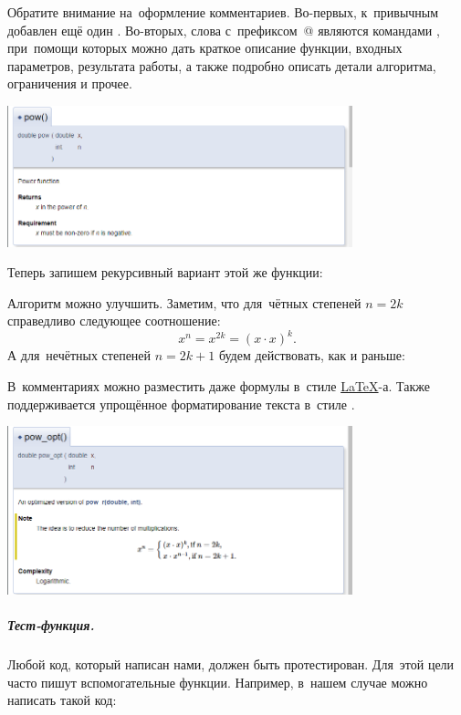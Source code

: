 Обратите внимание на~оформление комментариев. Во-первых, к~привычным \code{//} добавлен ещё один \code{/}. Во-вторых, слова с~префиксом~@ являются командами , при~помощи которых можно дать краткое описание функции, входных параметров, результата работы, а также подробно описать детали алгоритма, ограничения и прочее.

\begin{center}
  \includegraphics[width=0.75\textwidth]{images/doxygen_pow_description.png}
\end{center}

Теперь запишем рекурсивный вариант этой же функции:

Алгоритм можно улучшить. Заметим, что для~чётных степеней \(n = 2k\) справедливо следующее соотношение:
\[
  x^n = x^{2k} = (x\cdot x)^k.
\]
А для~нечётных степеней \(n = 2k + 1\) будем действовать, как и раньше:

В~комментариях можно разместить даже формулы в~стиле \href{\latexurl}{\LaTeX}-а. Также поддерживается упрощённое форматирование текста в~стиле \href{https://ru.wikipedia.org/wiki/Markdown}{}.

\begin{center}
  \includegraphics[width=0.75\textwidth]{images/doxygen_pow_opt_description.png}
\end{center}



\subparagraph{Тест-функция.}
Любой код, который написан нами, должен быть протестирован. Для~этой цели часто пишут вспомогательные функции. Например, в~нашем случае можно написать такой код:



